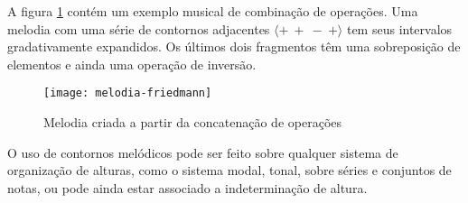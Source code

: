 A figura \ref{fig:melodia-concatenacao-operacoes} contém um exemplo
musical de combinação de operações. Uma melodia com uma série de
contornos adjacentes  $\langle+\:+\:-\:+\rangle$ tem seus
intervalos gradativamente expandidos. Os últimos dois fragmentos têm
uma sobreposição de elementos e ainda uma operação de inversão.

\begin{figure}
  \centering
  \texttt{[image: melodia-friedmann]}
  \caption{Melodia criada a partir da concatenação de operações}
  \label{fig:melodia-concatenacao-operacoes}
\end{figure}

O uso de contornos melódicos pode ser feito sobre qualquer sistema de
organização de alturas, como o sistema modal, tonal, sobre séries e
conjuntos de notas, ou pode ainda estar associado a indeterminação de
altura.
